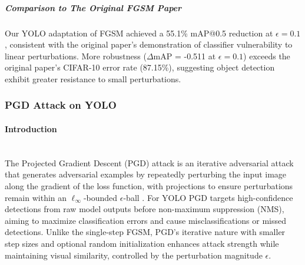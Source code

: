 \documentclass[../main.tex]{subfiles}
\begin{document}
\subparagraph{Comparison to The Original FGSM Paper}  
Our YOLO adaptation of FGSM achieved a 55.1\% mAP@0.5 reduction at $\epsilon=0.1$, consistent with the original paper's demonstration of classifier vulnerability to linear perturbations\cite{goodfellow2015explaining}. More robustness ($\Delta$mAP = -0.511 at $\epsilon=0.1$) exceeds the original paper's CIFAR-10 error rate (87.15\%)\cite{goodfellow2015explaining}, suggesting object detection exhibit greater resistance to small perturbations.


\subsubsection{PGD Attack on YOLO}

\paragraph{Introduction}\leavevmode\\
The Projected Gradient Descent (PGD) attack is an iterative adversarial attack that generates adversarial examples by repeatedly perturbing the input image along the gradient of the loss function, with projections to ensure perturbations remain within an $\ell_\infty$-bounded $\epsilon$-ball \cite{madry2018towardspgd}. For YOLO PGD targets high-confidence detections from raw model outputs before non-maximum suppression (NMS), aiming to maximize classification errors and cause misclassifications or missed detections. Unlike the single-step FGSM, PGD's iterative nature with smaller step sizes and optional random initialization enhances attack strength while maintaining visual similarity, controlled by the perturbation magnitude $\epsilon$.

\end{document}
